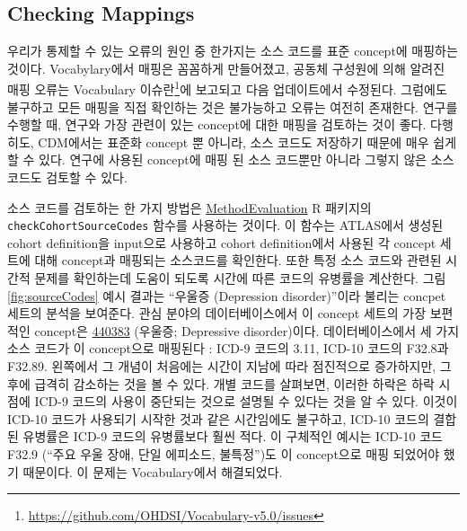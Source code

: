 \documentclass[11pt]{book}
\let\rmarkdownfootnote\footnote%
\def\footnote{\protect\rmarkdownfootnote}
\theoremstyle{definition}
\theoremstyle{definition}
\theoremstyle{definition}
\theoremstyle{remark}
\begin{document}
\subsection{Checking Mappings}\label{checking-mappings}

우리가 통제할 수 있는 오류의 원인 중 한가지는 소스 코드를 표준 concept에
매핑하는 것이다. Vocabylary에서 매핑은 꼼꼼하게 만들어졌고, 공동체
구성원에 의해 알려진 매핑 오류는 Vocabulary 이슈란\footnote{\url{https://github.com/OHDSI/Vocabulary-v5.0/issues}}에
보고되고 다음 업데이트에서 수정된다. 그럼에도 불구하고 모든 매핑을 직접
확인하는 것은 불가능하고 오류는 여전히 존재한다. 연구를 수행할 때,
연구와 가장 관련이 있는 concept에 대한 매핑을 검토하는 것이 좋다.
다행히도, CDM에서는 표준화 concept 뿐 아니라, 소스 코드도 저장하기
때문에 매우 쉽게 할 수 있다. 연구에 사용된 concept에 매핑 된 소스
코드뿐만 아니라 그렇지 않은 소스 코드도 검토할 수 있다.

소스 코드를 검토하는 한 가지 방법은
\href{https://ohdsi.github.io/MethodEvaluation/}{MethodEvaluation} R
패키지의 \texttt{checkCohortSourceCodes} 함수를 사용하는 것이다. 이
함수는 ATLAS에서 생성된 cohort definition을 input으로 사용하고 cohort
definition에서 사용된 각 concept 세트에 대해 concept과 매핑되는
소스코드를 확인한다. 또한 특정 소스 코드와 관련된 시간적 문제를
확인하는데 도움이 되도록 시간에 따른 코드의 유병률을 계산한다. 그림
\ref{fig:sourceCodes} 예시 결과는 ``우울증 (Depression disorder)''이라
불리는 concpet 세트의 분석을 보여준다. 관심 분야의 데이터베이스에서 이
concept 세트의 가장 보편적인 concept은
\href{http://athena.ohdsi.org/search-terms/terms/440383}{440383}
(우울증; Depressive disorder)이다. 데이터베이스에서 세 가지 소스 코드가
이 concept으로 매핑된다 : ICD-9 코드의 3.11, ICD-10 코드의 F32.8과
F32.89. 왼쪽에서 그 개념이 처음에는 시간이 지남에 따라 점진적으로
증가하지만, 그 후에 급격히 감소하는 것을 볼 수 있다. 개별 코드를
살펴보면, 이러한 하락은 하락 시점에 ICD-9 코드의 사용이 중단되는 것으로
설명될 수 있다는 것을 알 수 있다. 이것이 ICD-10 코드가 사용되기 시작한
것과 같은 시간임에도 불구하고, ICD-10 코드의 결합된 유병률은 ICD-9
코드의 유병률보다 훨씬 적다. 이 구체적인 예시는 ICD-10 코드 F32.9
(``주요 우울 장애, 단일 에피소드, 불특정'')도 이 concept으로 매핑
되었어야 했기 때문이다. 이 문제는 Vocabulary에서 해결되었다.
\end{document}
